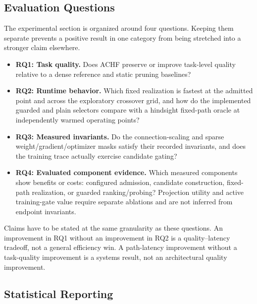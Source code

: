 \documentclass{article}
\newcommand{\achf}{\textsc{ACHF}}
\begin{document}
\subsection{Evaluation Questions}

The experimental section is organized around four questions. Keeping them
separate prevents a positive result in one category from being stretched into a
stronger claim elsewhere.

\begin{itemize}[leftmargin=*]
\item \textbf{RQ1: Task quality.} Does \achf{} preserve or improve task-level
quality relative to a dense reference and static pruning baselines?
\item \textbf{RQ2: Runtime behavior.} Which fixed realization is fastest at
the admitted point and across the exploratory crossover grid, and how do the
implemented guarded and plain selectors compare with a hindsight fixed-path
oracle at independently warmed operating points?
\item \textbf{RQ3: Measured invariants.} Do the connection-scaling and sparse
weight/gradient/optimizer masks satisfy their recorded invariants, and does the
training trace actually exercise candidate gating?
\item \textbf{RQ4: Evaluated component evidence.} Which measured components
show benefits or costs: configured admission, candidate construction,
fixed-path realization, or guarded ranking/probing? Projection utility and
active training-gate value require separate ablations and are not inferred
from endpoint invariants.
\end{itemize}

Claims have to be stated at the same granularity as these questions. An
improvement in RQ1 without an improvement in RQ2 is a quality--latency tradeoff,
not a general efficiency win. A path-latency improvement without a task-quality
improvement is a systems result, not an architectural quality improvement.

\subsection{Statistical Reporting}
\end{document}
